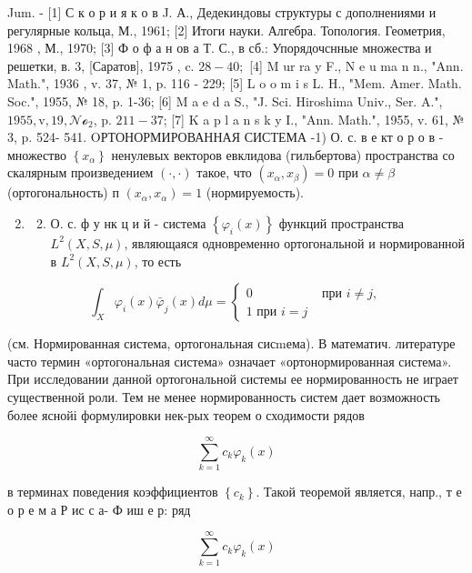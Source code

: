 \documentclass[10pt]{article}
\begin{document}
Jum. - [1] С к о р и я к о в J. А., Дедекиндовы структуры с дополнениями и регулярные кольца, М., 1961; [2] Итоги науки. Алгебра. Топология. Геометрия, 1968 , М., 1970; [3] Ф о ф а н ов а Т. С., в сб.: Упорядочснные множества и решетки, в. 3, [Саратов], 1975 , c. $28-40 ;$ [4] M ur ra y F., N e u ma n n., "Ann. Math.", 1936 , v. 37, № 1, p. 116 - 229; [5] L o o m i s L. H., "Mem. Amer. Math. Soc.", 1955, № 18, p. 1-36; [6] M a e d a S., "J. Sci. Hiroshima Univ., Ser. A.", $1955, \mathrm{v}, 19, \mathcal{N o}_{2}$, p. $211-37$; [7] K a p l a n s k y I., "Ann. Math.", 1955, v. 61, № 3, p. 524-
541. OРТОНОРМИРОВАННАЯ СИСТЕМА -1) О. с. в е кт о р о в - множество $\left\{x_{\alpha}\right\}$ ненулевых векторов евклидова (гильбертова) пространства со скалярным произведением $(\cdot, \cdot)$ такое, что $\left(x_{\alpha}, x_{\beta}\right)=0$ при $\alpha \neq \beta$ (ортогональность) п $\left(x_{\alpha}, x_{\alpha}\right)=1$ (нормируемость).

\begin{enumerate}
  \setcounter{enumi}{1}
  \item 
  \begin{enumerate}
    \setcounter{enumii}{1}
    \item О. с. ф у нк ц и й - система $\left\{\varphi_{i}(x)\right\}$ функций пространства $L^{2}(X, S, \mu)$, являющаяся одновременно ортогональной и нормированной в $L^{2}(X, S, \mu)$, то есть
  \end{enumerate}
\end{enumerate}

\[
\int_{X} \varphi_{i}(x) \bar{\varphi}_{j}(x) d \mu= \begin{cases}0 & \text { при } i \neq j, \\ 1 \text { при } i=j\end{cases}
\]

(см. Нормированная система, ортогональная сисmема). В математич. литературе часто термин «ортогональная система» означает «ортонормированная система». При исследовании данной ортогональной системы ее нормированность не играет существенной роли. Тем не менее нормированность систем дает возможность более яснойі формулировки нек-рых теорем о сходимости рядов

\[
\sum_{k=1}^{\infty} c_{k} \varphi_{k}(x)
\]

в терминах поведения коэффициентов $\left\{c_{k}\right\}$. Такой теоремой является, напр., т е о р е м а Р ис с а- Ф иш е р: ряд

\[
\sum_{k=1}^{\infty} c_{k} \varphi_{k}(x)
\]
\end{document}
